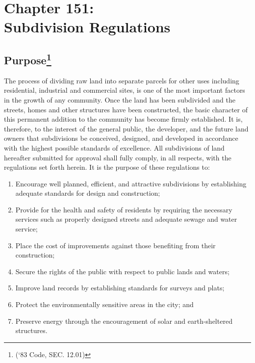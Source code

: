\chapter*{Chapter 151: \\
	Subdivision Regulations}
    \vfill
    \minitoc
    \pagebreak


\section{Purpose\footnote{(‘83 Code, SEC. 12.01)}}
The process of dividing raw land into separate parcels for other uses including residential, industrial and commercial sites, is one of the most important factors in the growth of any community. Once the land has been subdivided and the streets, homes and other structures have been constructed, the basic character of this permanent addition to the community has become firmly established. It is, therefore, to the interest of the general public, the developer, and the future land owners that subdivisions be conceived, designed, and developed in accordance with the highest possible standards of excellence. All subdivisions of land hereafter submitted for approval shall fully comply, in all respects, with the regulations set forth herein. It is the purpose of these regulations to:
\begin{enumerate}[{\indent}A)]
    \item Encourage well planned, efficient, and attractive subdivisions by establishing adequate standards for design and construction; 
    \item Provide for the health and safety of residents by requiring the necessary services such as properly designed streets and adequate sewage and water service; 
    \item Place the cost of improvements against those benefiting from their construction; 
    \item Secure the rights of the public with respect to public lands and waters; 
    \item Improve land records by establishing standards for surveys and plats; 
    \item Protect the environmentally sensitive areas in the city; and 
    \item Preserve energy through the encouragement of solar and earth-sheltered structures.
\end{enumerate}


